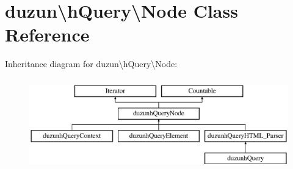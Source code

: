 \hypertarget{classduzun_1_1hQuery_1_1Node}{}\section{duzun\textbackslash{}h\+Query\textbackslash{}Node Class Reference}
\label{classduzun_1_1hQuery_1_1Node}
Inheritance diagram for duzun\textbackslash{}h\+Query\textbackslash{}Node\+:\begin{figure}[H]
\begin{center}
\leavevmode
\includegraphics[height=4.000000cm]{classduzun_1_1hQuery_1_1Node}
\end{center}
\end{figure}
